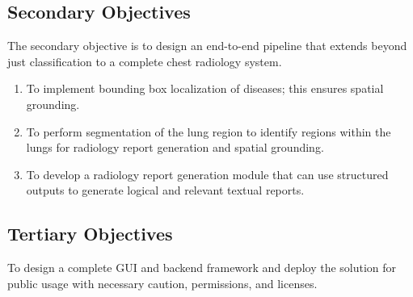 \subsection{Secondary Objectives}
The secondary objective is to design an end-to-end pipeline that extends beyond just classification to a complete chest radiology system.

\begin{enumerate}
\item To implement bounding box localization of diseases; this ensures spatial grounding.
\item To perform segmentation of the lung region to identify regions within the lungs for radiology report generation and spatial grounding.
\item To develop a radiology report generation module that can use structured outputs to generate logical and relevant textual reports.
\end{enumerate}

\subsection{Tertiary Objectives}
To design a complete GUI and backend framework and deploy the solution for public usage with necessary caution, permissions, and licenses.